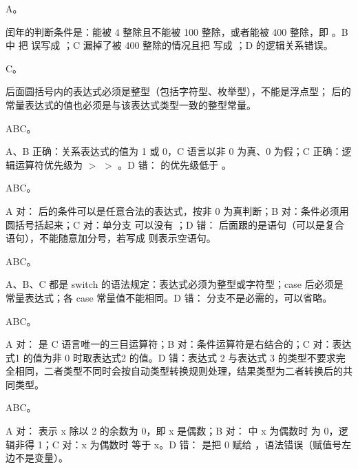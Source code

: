 \documentclass[a4paper,11pt]{article}
\begin{document}
\q A。\begin{analysis}闰年的判断条件是：能被 4 整除且不能被 100 整除，或者能被 400 整除，即 。B 中  把 \code{==} 误写成 \code{=}；C 漏掉了被 400 整除的情况且把 \code{==} 写成 \code{=}；D 的逻辑关系错误。\end{analysis}

\q C。\begin{analysis} 后面圆括号内的表达式必须是整型（包括字符型、枚举型），不能是浮点型； 后的常量表达式的值也必须是与该表达式类型一致的整型常量。\end{analysis}


\q ABC。\begin{analysis}A、B 正确：关系表达式的值为 1 或 0，C 语言以非 0 为真、0 为假；C 正确：逻辑运算符优先级为 \code{!} $>$ \code{\&\&} $>$ \code{||}。D 错：\code{||} 的优先级低于 \code{\&\&}。\end{analysis}

\q ABC。\begin{analysis}A 对： 后的条件可以是任意合法的表达式，按非 0 为真判断；B 对：条件必须用圆括号括起来；C 对：单分支  可以没有 ；D 错： 后面跟的是语句（可以是复合语句），不能随意加分号，若写成  则表示空语句。\end{analysis}

\q ABC。\begin{analysis}A、B、C 都是 switch 的语法规定：表达式必须为整型或字符型；case 后必须是常量表达式；各 case 常量值不能相同。D 错： 分支不是必需的，可以省略。\end{analysis}

\q ABC。\begin{analysis}A 对： 是 C 语言唯一的三目运算符；B 对：条件运算符是右结合的；C 对：表达式1 的值为非 0 时取表达式2 的值。D 错：表达式 2 与表达式 3 的类型不要求完全相同，二者类型不同时会按自动类型转换规则处理，结果类型为二者转换后的共同类型。\end{analysis}

\q ABC。\begin{analysis}A 对： 表示 x 除以 2 的余数为 0，即 x 是偶数；B 对： 中 x 为偶数时  为 0，逻辑非得 1；C 对：x 为偶数时  等于 x。D 错： 是把 0 赋给 ，语法错误（赋值号左边不是变量）。\end{analysis}
\end{document}
